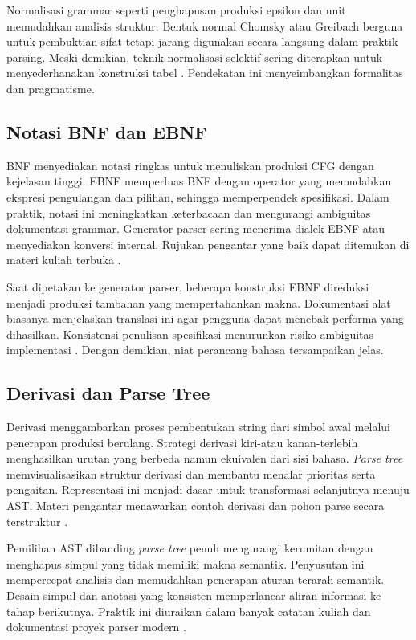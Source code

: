 \documentclass[../main.tex]{subfiles}
\begin{document}
Normalisasi grammar seperti penghapusan produksi epsilon dan unit memudahkan analisis struktur. Bentuk normal Chomsky atau Greibach berguna untuk pembuktian sifat tetapi jarang digunakan secara langsung dalam praktik parsing. Meski demikian, teknik normalisasi selektif sering diterapkan untuk menyederhanakan konstruksi tabel \citep{Mogensen2010}. Pendekatan ini menyeimbangkan formalitas dan pragmatisme.

\subsection{Notasi BNF dan EBNF}
BNF menyediakan notasi ringkas untuk menuliskan produksi CFG dengan kejelasan tinggi. EBNF memperluas BNF dengan operator yang memudahkan ekspresi pengulangan dan pilihan, sehingga memperpendek spesifikasi. Dalam praktik, notasi ini meningkatkan keterbacaan dan mengurangi ambiguitas dokumentasi grammar. Generator parser sering menerima dialek EBNF atau menyediakan konversi internal. Rujukan pengantar yang baik dapat ditemukan di materi kuliah terbuka \citep{CS143}.

Saat dipetakan ke generator parser, beberapa konstruksi EBNF direduksi menjadi produksi tambahan yang mempertahankan makna. Dokumentasi alat biasanya menjelaskan translasi ini agar pengguna dapat menebak performa yang dihasilkan. Konsistensi penulisan spesifikasi menurunkan risiko ambiguitas implementasi \citep{CS143}. Dengan demikian, niat perancang bahasa tersampaikan jelas.

\subsection{Derivasi dan Parse Tree}
Derivasi menggambarkan proses pembentukan string dari simbol awal melalui penerapan produksi berulang. Strategi derivasi kiri-atau kanan-terlebih menghasilkan urutan yang berbeda namun ekuivalen dari sisi bahasa. \emph{Parse tree} memvisualisasikan struktur derivasi dan membantu menalar prioritas serta pengaitan. Representasi ini menjadi dasar untuk transformasi selanjutnya menuju AST. Materi pengantar menawarkan contoh derivasi dan pohon parse secara terstruktur \citep{CS143}.

Pemilihan AST dibanding \emph{parse tree} penuh mengurangi kerumitan dengan menghapus simpul yang tidak memiliki makna semantik. Penyusutan ini mempercepat analisis dan memudahkan penerapan aturan terarah semantik. Desain simpul dan anotasi yang konsisten memperlancar aliran informasi ke tahap berikutnya. Praktik ini diuraikan dalam banyak catatan kuliah dan dokumentasi proyek parser modern \citep{WikiAST,ANTLRDocs}.
\end{document}
